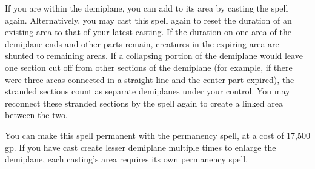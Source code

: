 {If you are within the demiplane, you can add to its area by casting the spell again. Alternatively, you may cast this spell again to reset the duration of an existing area to that of your latest casting. If the duration on one area of the demiplane ends and other parts remain, creatures in the expiring area are shunted to remaining areas. If a collapsing portion of the demiplane would leave one section cut off from other sections of the demiplane (for example, if there were three areas connected in a straight line and the center part expired), the stranded sections count as separate demiplanes under your control. You may reconnect these stranded sections by the spell again to create a linked area between the two.

You can make this spell permanent with the permanency spell, at a cost of 17,500 gp. If you have cast create lesser demiplane multiple times to enlarge the demiplane, each casting's area requires its own permanency spell.}
        
